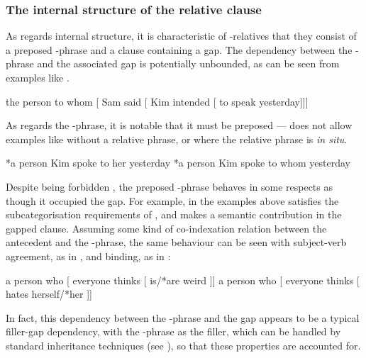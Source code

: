\documentclass[output=paper,nonflat,draftmode]{./langsci/langscibook}
\begin{document}
\subsubsection{The internal structure of the relative clause}
\label{sec:rc-intern-struct-relat}
As regards internal structure, it is characteristic of -relatives that
they consist of a preposed -phrase and a clause containing a gap.
The dependency between the -phrase and the associated gap is potentially
unbounded, as can be seen from examples like .
\begin{exe}\ex\label{x:rc-11}
  the person to whom [ Sam said [ Kim intended [ to speak \uGap yesterday]]]
\end{exe}
As regards the -phrase, it is notable that it must be preposed --- 
does not allow examples like  without a relative phrase, or  where
the relative phrase is \emph{in situ}.
\begin{exe}\ex\begin{xlist}\label{x:rc-8}
  \ex\label{x:rc-9} *a person Kim spoke to her yesterday
  \ex\label{x:rc-10} *a person Kim spoke to whom yesterday
\end{xlist}\end{exe}
Despite being forbidden , the preposed -phrase behaves in some
respects as though it occupied the gap. For example, in the  examples above 
satisfies the subcategorisation requirements of , and makes a semantic
contribution in the gapped clause.  Assuming some kind of co-indexation relation
between the antecedent and the -phrase, the same behaviour can be seen with
subject-verb agreement, as in , and binding, as in :
\begin{exe}\ex\begin{xlist}
  \ex\label{x:rc-166} a person who [ everyone thinks [ \uGap is/*are weird ]]
  \ex\label{x:rc-167} a person who [ everyone thinks [ \uGap hates herself/*her ]]
\end{xlist}\end{exe}
In fact, this dependency between the -phrase and the gap appears to be a typical
filler-gap dependency, with the -phrase as the filler,  which can be handled by
standard  inheritance techniques (see ), so that these
properties are accounted for.
\end{document}
